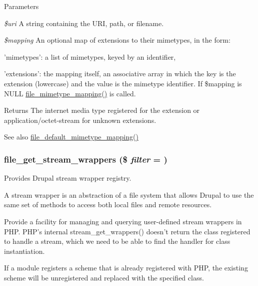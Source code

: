 \begin{DoxyParams}{Parameters}
\item[{\em \$uri}]A string containing the URI, path, or filename. \item[{\em \$mapping}]An optional map of extensions to their mimetypes, in the form:
\begin{DoxyItemize}
\item 'mimetypes': a list of mimetypes, keyed by an identifier,
\item 'extensions': the mapping itself, an associative array in which the key is the extension (lowercase) and the value is the mimetype identifier. If \$mapping is NULL \hyperlink{file_8mimetypes_8inc_a92dcd553bb93d58cd4e25c1dc64c7386}{file\_\-mimetype\_\-mapping()} is called.
\end{DoxyItemize}\end{DoxyParams}
\begin{DoxyReturn}{Returns}
The internet media type registered for the extension or application/octet-\/stream for unknown extensions.
\end{DoxyReturn}
\begin{DoxySeeAlso}{See also}
\hyperlink{file_8mimetypes_8inc_a8a8064ffcafb048d0c7dd61ba261b876}{file\_\-default\_\-mimetype\_\-mapping()} 
\end{DoxySeeAlso}
\hypertarget{group__file_ga0cd34cfd1bacb36b8ff82d01fb9a6f79}{
\subsubsection[{file\_\-get\_\-stream\_\-wrappers}]{\setlength{\rightskip}{0pt plus 5cm}file\_\-get\_\-stream\_\-wrappers (\$ {\em filter} = {})}}
\label{group__file_ga0cd34cfd1bacb36b8ff82d01fb9a6f79}
Provides Drupal stream wrapper registry.

A stream wrapper is an abstraction of a file system that allows Drupal to use the same set of methods to access both local files and remote resources.

Provide a facility for managing and querying user-\/defined stream wrappers in PHP. PHP's internal stream\_\-get\_\-wrappers() doesn't return the class registered to handle a stream, which we need to be able to find the handler for class instantiation.

If a module registers a scheme that is already registered with PHP, the existing scheme will be unregistered and replaced with the specified class.

